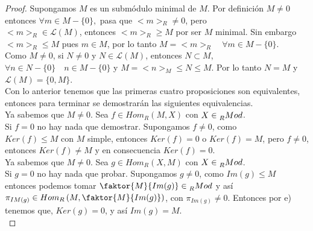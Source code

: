 \documentclass{article}
\newcommand{\La}{\mathscr{L}}
\theoremstyle{definition}
\theoremstyle{plain}
\theoremstyle{plain}
\theoremstyle{definition}
\theoremstyle{definition}
\theoremstyle{definition}
\theoremstyle{definition}
\theoremstyle{definition}
\theoremstyle{definition}
\begin{document}
\begin{enumerate}[label=\textbf{Ej \arabic*.}]
\begin{proof}
	Supongamos $M$ es un submódulo minimal de $M$. Por definición $M\neq 0$ entonces 
	$\forall m\in M-\{0\},$ pasa que $<m>_R\neq 0$, pero \\
	$<m>_R\in \La(M)$, entonces $<m>_R\geq M$ por ser $M$ minimal.
	Sin embargo $<m>_R\leq M$ pues $m\in M$, por lo tanto $M=<m>_R\quad \forall m\in M-\{0\}$.\\
	
	 Como $M\neq 0$, si $N\neq 0$ y $N\in \La(M)$, entonces $N\subset M$,
	$\forall n\in N-\{0\}\quad n\in M-\{0\}$ y $M=<n>_M\leq N\leq M$. Por lo tanto $N=M$ y $\La(M)=\{0,M\}$.\\
	
	Con lo anterior tenemos que las primeras cuatro proposiciones son equivalentes, entonces para terminar se demostrarán 
	las siguientes equivalencias.\\
	
	 Ya sabemos que $M\neq 0$. Sea $f\in Hom_R(M,X)$ con $X\in \prescript{}{R}{Mod}$.\\
	Si $f=0$ no hay nada que demostrar. Supongamos $f\neq 0$, como \\
	$Ker(f)\leq M$ con $M$ simple, entonces 
	$Ker(f)=0$ o $Ker(f)=M$, pero $f\neq 0$, entonces $Ker(f)\neq M$ y en consecuencia $Ker(f)=0$.\\
	
	 Ya sabemos que $M\neq 0$. Sea $g\in Hom_R(X,M)$ con $X\in \prescript{}{R}{Mod}$.\\
	Si $g=0$ no hay nada que probar. Supongamos $g\neq 0$, como $Im(g)\leq M$ entonces podemos tomar 
	$\faktor{M}{Im(g)} \in \prescript{}{R}{Mod}$ y así \\
	$\pi_{IM(g)}\in Hom_R\left(M,\faktor{M}{Im(g)}\right)$, con $\pi_{Im(g)}\neq 0 $. Entonces por e) tenemos  que, $Ker(g)=0$, y así $Im(g)=M$.\\
	

\end{proof}
\end{enumerate}
\end{document}
